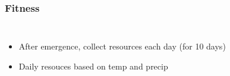 \documentclass[pdf]{beamer}
\begin{document}
\begin{frame}
\frametitle{Fitness}

\begin{columns}


\begin{itemize}

 \item After emergence, collect resources each day (for 10 days)

 \item Daily resouces based on temp and precip

\end{itemize}




\end{columns}

\end{frame}
\end{document}
